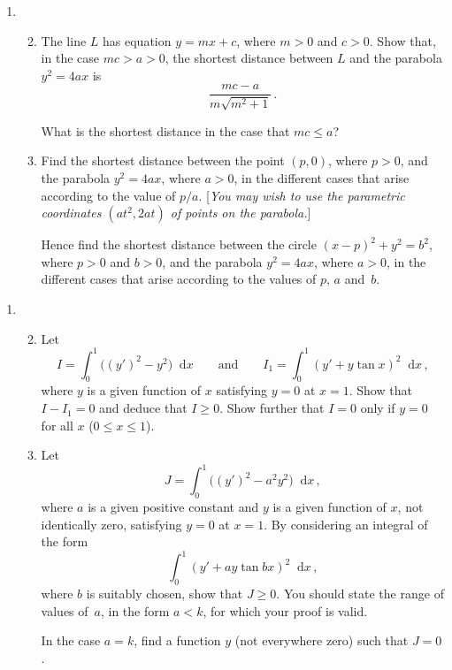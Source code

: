 \documentclass[a4, 11pt]{report}
\newlength{\qspace}
\newcounter{qnumber}
\newenvironment{question}%
 {\vspace{\qspace}
  \begin{enumerate}[\bfseries 1\quad][10]%
    \setcounter{enumi}{\value{qnumber}}%
    \item%
 }
{
  \end{enumerate}
  \filbreak
  \stepcounter{qnumber}
 }
\newenvironment{questionparts}[1][1]%
 {
  \begin{enumerate}[\bfseries (i)]%
    \setcounter{enumii}{#1}
    \addtocounter{enumii}{-1}
    \setlength{\itemsep}{5mm}
    \setlength{\parskip}{8pt}
 }
 {
  \end{enumerate}
 }
\def\le{\leqslant}
\def\ge{\geqslant}
\renewcommand{\.}[1]{\ensuremath{\mathrm{#1}}}
\newcommand{\+}[1]{\ensuremath{\mathbf{#1}}}
\newcommand{\ud}{\mathop{}\!\mathrm{d}}
\begin{document}
\begin{question}
  \begin{questionparts}
  \item The line $L$ has equation $y=mx+c$, where $m>0$ and $c>0$.
    Show that, in the case  $mc>a>0$, 
the shortest distance between $L$ and the parabola
    $y^2=4ax$ is 
    \[ \frac{mc-a}{m\sqrt{m^2+1}}\,.\]

    What is the shortest distance in the case that $mc\le a$?
  \item Find the shortest distance between the point $(p,0)$, where
    $p>0$, and the parabola $y^2=4ax$, where $a>0$, in the different
    cases that arise according to the value of $p/a$.  [\textit{You
      may wish to use the parametric coordinates $(at^2, 2at)$ of
      points on the parabola.}]

    Hence find the shortest distance between the circle $(x-p)^2 + y^2
    =b^2$, where $p>0$ and $b>0$, and the parabola $y^2=4ax$, where $a>0$,
 in the
    different cases that arise according to the values of $p$, $a$
    and~$b$.
  \end{questionparts}
\end{question}

\begin{question}
  \begin{questionparts}
  \item Let
    \[
    I = \int_0^1 \bigl((y')^2 -y^2\bigr)\ud x \qquad\text{and}\qquad
    I_1=\int_0^1 (y'+y\tan x)^2 \ud x \,,
    \]
    where $y$ is a given function of $x$ satisfying $y=0$ at 
    $x=1$.  Show that $I-I_1=0$ and deduce that $I\ge0$. Show further
    that $I=0$ only if $y=0$ for all $x$ ($0\le x \le 1$).

  \item 
Let 
\[
J  = \int_0^1 \bigl((y')^2 -a^2y^2\bigr)\ud x 
\,,
\]
where $a$ is a given positive constant and  $y$ is a given function of $x$,
not identically zero, satisfying $y=0$ at 
    $x=1$. 
By considering an integral of the form
\[
\int_0^1 (y'+ay\tan bx)^2 \ud x \,,
\]
where  $b$ is suitably chosen, show that
$J\ge0$. You should state the range of values of~$a$, in the form
 $a<k$, for which your proof is valid.

In the case $a=k$, find a function $y$ (not everywhere zero)
such that $J=0$.

  \end{questionparts} 
\end{question}
\end{document}
